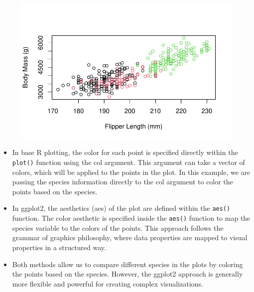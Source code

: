 \documentclass[
  letterpaper,
  DIV=11,
  numbers=noendperiod]{scrreprt}
\begin{document}
\begin{figure}[H]

{\centering \includegraphics{scripts/02_dataViz/class4_files/figure-pdf/num_vs_num_species-1.pdf}

}

\end{figure}

\begin{tcolorbox}[enhanced jigsaw, left=2mm, colframe=quarto-callout-note-color-frame, leftrule=.75mm, opacitybacktitle=0.6, toptitle=1mm, title=\textcolor{quarto-callout-note-color}{\faInfo}\hspace{0.5em}{Note}, opacityback=0, coltitle=black, colbacktitle=quarto-callout-note-color!10!white, breakable, colback=white, titlerule=0mm, bottomrule=.15mm, arc=.35mm, bottomtitle=1mm, rightrule=.15mm, toprule=.15mm]

\begin{itemize}
\item
  In base R plotting, the color for each point is specified directly
  within the \texttt{plot()} function using the col argument. This
  argument can take a vector of colors, which will be applied to the
  points in the plot. In this example, we are passing the species
  information directly to the col argument to color the points based on
  the species.
\item
  In ggplot2, the aesthetics (aes) of the plot are defined within the
  \texttt{aes()} function. The color aesthetic is specified inside the
  \texttt{aes()} function to map the species variable to the colors of
  the points. This approach follows the grammar of graphics philosophy,
  where data properties are mapped to visual properties in a structured
  way.
\item
  Both methods allow us to compare different species in the plots by
  coloring the points based on the species. However, the ggplot2
  approach is generally more flexible and powerful for creating complex
  visualizations.
\end{itemize}

\end{tcolorbox}
\end{document}
